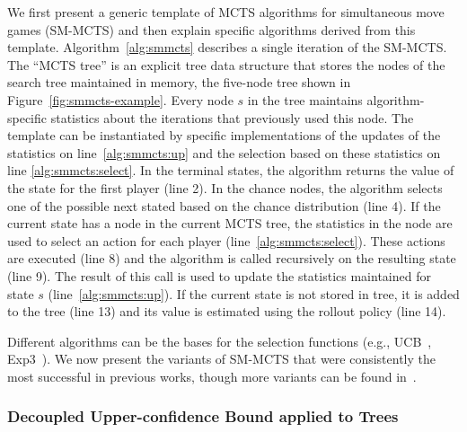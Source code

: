 We first present a generic template of MCTS algorithms for simultaneous move games (SM-MCTS) and then explain specific algorithms derived from this template.
Algorithm~\ref{alg:smmcts} describes a single iteration of the SM-MCTS. 
The ``MCTS tree'' is an explicit tree data structure that stores the nodes of the search tree maintained in memory, 
\eg the five-node tree shown in Figure~\ref{fig:smmcts-example}.
Every node $s$ in the tree maintains algorithm-specific statistics about the iterations that previously used this node.
The template can be instantiated by specific implementations of the updates of the statistics on line~\ref{alg:smmcts:up} and the selection based on these statistics on line \ref{alg:smmcts:select}.
In the terminal states, the algorithm returns the value of the state for the first player (line 2).
In the chance nodes, the algorithm selects one of the possible next stated based on the chance distribution (line 4).
If the current state has a node in the current MCTS tree, the statistics in the node are used to select an action for each player (line~\ref{alg:smmcts:select}).
These actions are executed (line 8) and the algorithm is called recursively on the resulting state (line 9).
The result of this call is used to update the statistics maintained for state $s$ (line~\ref{alg:smmcts:up}).
If the current state is not stored in tree, it is added to the tree (line 13) and its value is estimated using the rollout policy (line 14).

Different algorithms can be the bases for the selection functions (e.g., UCB~\cite{UCB}, Exp3~\cite{Auer2003Exp3}).
We now present the variants of SM-MCTS that were consistently the most successful in previous works, 
though more variants can be found in~\cite{Perick12Comparison,Lanctot13Tron,Tak14smmcts}.

\subsubsection{Decoupled Upper-confidence Bound applied to Trees}\label{sec:duct}

